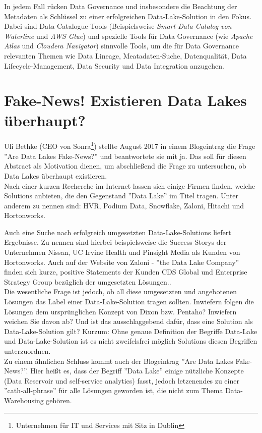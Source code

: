 \documentclass[twoside,twocolumn]{article}
\begin{document}
In jedem Fall rücken Data Governance und insbesondere die Beachtung der Metadaten als Schlüssel zu einer erfolgreichen Data-Lake-Solution in den Fokus. Dabei sind Data-Catalogue-Tools (Beispielsweise \textit{Smart Data Catalog von Waterline} und \textit{AWS Glue}) und spezielle Tools für Data Governance (wie \textit{Apache Atlas} und \textit{Cloudera Navigator}) sinnvolle Tools, um die für Data Governance relevanten Themen wie Data Lineage, Meatadaten-Suche, Datenqualität, Data Lifecycle-Management, Data Security und Data Integration anzugehen.\cite{src8}

\section{Fake-News! Existieren Data Lakes überhaupt?}
Uli Bethke (CEO von Sonra\footnote{Unternehmen für IT und Services mit Sitz in Dublin}) stellte August 2017 in einem Blogeintrag\cite{src4} die Frage ''Are Data Lakes Fake-News?'' und beantwortete sie mit ja. Das soll für diesen Abstract als Motivation dienen, um abschließend die Frage zu untersuchen, ob Data Lakes überhaupt existieren.\\

Nach einer kurzen Recherche im Internet lassen sich einige Firmen finden, welche Solutions anbieten, die den Gegenstand ''Data Lake'' im Titel tragen. Unter anderem zu nennen sind: HVR, Podium Data, Snowflake, Zaloni\cite{c1}, Hitachi\cite{c2} und Hortonworks\cite{c3}.

Auch eine Suche nach erfolgreich umgesetzten Data-Lake-Solutions liefert Ergebnisse. 
Zu nennen sind hierbei beispielsweise die Success-Storys der Unternehmen Nissan\cite{s1}, UC Irvine Health\cite{s2} und Pinsight Media\cite{s3} als Kunden von Hortonworks. Auch auf der Website von Zaloni - ''the Data Lake Company'' finden sich kurze, positive Statements der Kunden CDS Global und Enterprise Strategy Group bezüglich der umgesetzten Lösungen.\cite{s4}.\\

Die wesentliche Frage ist jedoch, ob all diese umgesetzten und angebotenen Lösungen das Label einer Data-Lake-Solution tragen sollten. Inwiefern folgen die Lösungen dem ursprünglichen Konzept von Dixon bzw. Pentaho? Inwiefern weichen Sie davon ab? Und ist das ausschlaggebend dafür, dass eine Solution als Data-Lake-Solution gilt? Kurzum: Ohne genaue Definition der Begriffe Data-Lake und Data-Lake-Solution ist es nicht zweifelsfrei möglich Solutions diesen Begriffen unterzuordnen.\\
Zu einem ähnlichen Schluss kommt auch der Blogeintrag ''Are Data Lakes Fake-News?''. Hier heißt es, dass der Begriff ''Data Lake'' einige nützliche Konzepte (Data Reservoir und self-service analytics) fasst, jedoch letzenendes zu einer ''cath-all-phrase'' für alle Lösungen geworden ist, die nicht zum Thema Data-Warehousing gehören.\cite{src4}\\
\end{document}
